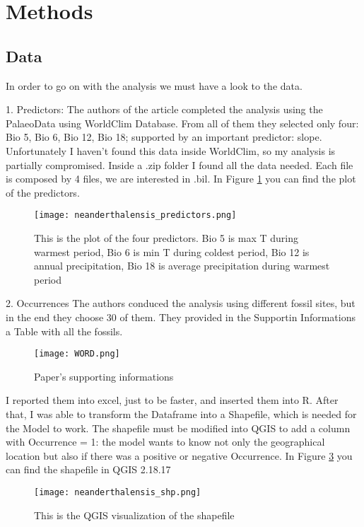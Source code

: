 \documentclass[a4paper,12pt]{article}
\begin{document}
\section{Methods}
    \subsection{Data}
	In order to go on with the analysis we must have a look to the data.
	
	1. Predictors:
	    The authors of the article completed the analysis using the PalaeoData using WorldClim Database. From all of them they selected only four: Bio 5, Bio 6, Bio 12, Bio 18; supported by an important predictor: slope. Unfortunately I haven't found this data inside WorldClim, so my analysis is partially compromised.
	    Inside a .zip folder I found all the data needed. Each file is composed by 4 files, we are interested in .bil. 
	    In Figure \ref{fig:preds} you can find the plot of the predictors. 
\begin{figure}
    \centering
        \texttt{[image: neanderthalensis\_predictors.png]}
        \caption{This is the plot of the four predictors. Bio 5 is max T during warmest period, Bio 6 is min T during coldest period, Bio 12 is annual precipitation, Bio 18 is average precipitation during warmest period}
    \label{fig:preds}
\end{figure}	    
    2. Occurrences
        The authors conduced the analysis using different fossil sites, but in the end they choose 30 of them. They provided in the Supportin Informations a Table with all the fossils. 
\begin{figure}
\centering
    \texttt{[image: WORD.png]}
    \caption{Paper's supporting informations}
    \label{fig:word}
\end{figure}
        I reported them into excel, just to be faster, and inserted them into R. After that, I was able to transform the Dataframe into a Shapefile, which is needed for the Model to work. 
        The shapefile must be modified into QGIS to add a column with Occurrence = 1: the model wants to know not only the geographical location but also if there was a positive or negative Occurrence. 
        In Figure \ref{fig:shapefile} you can find the shapefile in QGIS 2.18.17
\begin{figure}
\centering
    \texttt{[image: neanderthalensis\_shp.png]}
    \caption{This is the QGIS visualization of the shapefile}
    \label{fig:shapefile}
\end{figure}
\end{document}
